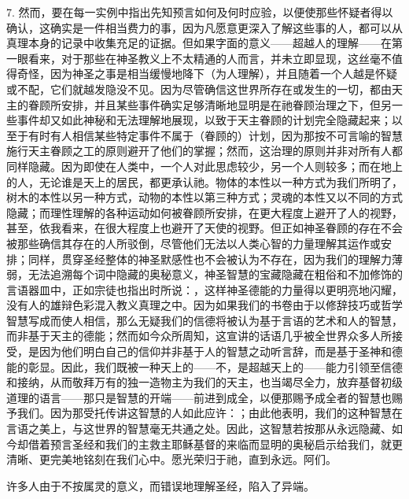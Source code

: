 7. 然而，要在每一实例中指出先知预言如何及何时应验，以便使那些怀疑者得以确认，这确实是一件相当费力的事，因为凡愿意更深入了解这些事的人，都可以从真理本身的记录中收集充足的证据。但如果字面的意义——超越人的理解——在第一眼看来，对于那些在神圣教义上不太精通的人而言，并未立即显现，这丝毫不值得奇怪，因为神圣之事是相当缓慢地降下（为人理解），并且随着一个人越是怀疑或不配，它们就越发隐没不见。因为尽管确信这世界所存在或发生的一切，都由天主的眷顾所安排，并且某些事件确实足够清晰地显明是在祂眷顾治理之下，但另一些事件却又如此神秘和无法理解地展现，以致于天主眷顾的计划完全隐藏起来；以至于有时有人相信某些特定事件不属于（眷顾的）计划，因为那按不可言喻的智慧施行天主眷顾之工的原则避开了他们的掌握；然而，这治理的原则并非对所有人都同样隐藏。因为即使在人类中，一个人对此思虑较少，另一个人则较多；而在地上的人，无论谁是天上的居民，都更承认祂。物体的本性以一种方式为我们所明了，树木的本性以另一种方式，动物的本性以第三种方式；灵魂的本性又以不同的方式隐藏；而理性理解的各种运动如何被眷顾所安排，在更大程度上避开了人的视野，甚至，依我看来，在很大程度上也避开了天使的视野。但正如神圣眷顾的存在不会被那些确信其存在的人所驳倒，尽管他们无法以人类心智的力量理解其运作或安排；同样，贯穿圣经整体的神圣默感性也不会被认为不存在，因为我们的理解力薄弱，无法追溯每个词中隐藏的奥秘意义，神圣智慧的宝藏隐藏在粗俗和不加修饰的言语器皿中，正如宗徒也指出时所说：，这样神圣德能的力量得以更明亮地闪耀，没有人的雄辩色彩混入教义真理之中。因为如果我们的书卷由于以修辞技巧或哲学智慧写成而使人相信，那么无疑我们的信德将被认为基于言语的艺术和人的智慧，而非基于天主的德能；然而如今众所周知，这宣讲的话语几乎被全世界众多人所接受，是因为他们明白自己的信仰并非基于人的智慧之动听言辞，而是基于圣神和德能的彰显。因此，我们既被一种天上的——不，是超越天上的——能力引领至信德和接纳，从而敬拜万有的独一造物主为我们的天主，也当竭尽全力，放弃基督初级道理的语言——那只是智慧的开端——前进到成全，以便那赐予成全者的智慧也赐予我们。因为那受托传讲这智慧的人如此应许：；由此他表明，我们的这种智慧在言语之美上，与这世界的智慧毫无共通之处。因此，这智慧若按那从永远隐藏、如今却借着预言圣经和我们的主救主耶稣基督的来临而显明的奥秘启示给我们，就更清晰、更完美地铭刻在我们心中。愿光荣归于祂，直到永远。阿们。\par

许多人由于不按属灵的意义，而错误地理解圣经，陷入了异端。\par

